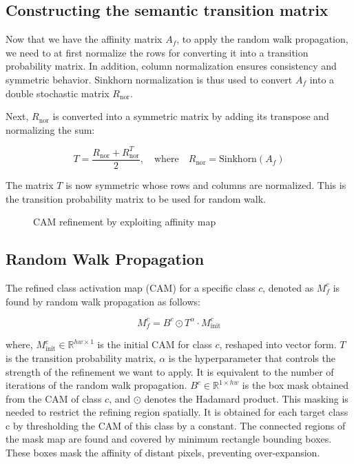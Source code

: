 \subsection{Constructing the semantic transition matrix}
\label{subsec:trans_mat}
Now that we have the affinity matrix $A_f$, to apply the random walk propagation, we need to at first normalize the rows for converting it into a transition probability matrix. In addition, column normalization ensures consistency and symmetric behavior. Sinkhorn normalization \cite{math_sinkhorn} is thus used to convert $A_f$ into a double stochastic matrix $R_{\text{nor}}$.

Next, $R_{\text{nor}}$ is converted into a symmetric matrix by adding its transpose and normalizing the sum:

\[
    T = \frac{R_{\text{nor}} + R_{\text{nor}}^T}{2}, \quad \text{where} \quad R_{\text{nor}} = \text{Sinkhorn}(A_f)
\]

The matrix $T$ is now symmetric whose rows and columns are normalized. This is the transition probability matrix to be used for random walk.


\begin{figure}[tbp]
    \centering
    \caption{CAM refinement by exploiting affinity map}
    \label{fig:refinement}
\end{figure}

\subsection{Random Walk Propagation}
\label{subsec:random_walk}

The refined class activation map (CAM) for a specific class $c$, denoted as $M^c_f$ is found by random walk propagation as follows:

\begin{equation}
    M_f^c = B^c \odot T^\alpha \cdot M_{\text{init}}^c
\end{equation}

where, $M^c_{\text{init}} \in \mathbb{R}^{hw \times 1}$ is the initial CAM for class $c$, reshaped into vector form. $T$ is the transition probability matrix, $\alpha$ is the hyperparameter that controls the strength of the refinement we want to apply. It is equivalent to the number of iterations of the random walk propagation. \( B^c \in \mathbb{R}^{1 \times hw} \) is the box mask obtained from the CAM of class \( c \), and \( \odot \) denotes the Hadamard product. This masking is needed to restrict the refining region spatially. It is obtained for each target class c by thresholding the CAM of this class by a constant. The connected regions of the mask map are found and covered by minimum rectangle bounding boxes. These boxes mask the affinity of distant pixels, preventing over-expansion.

